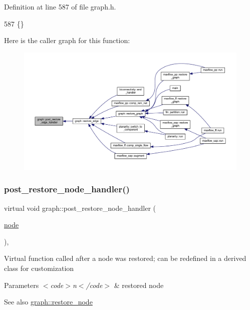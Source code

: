 Definition at line 587 of file graph.\+h.


\begin{DoxyCode}
587 \{\}
\end{DoxyCode}
Here is the caller graph for this function\+:
\nopagebreak
\begin{figure}[H]
\begin{center}
\leavevmode
\includegraphics[width=350pt]{classgraph_adfc71011ae82f047c550eba6d9e7bb3a_icgraph}
\end{center}
\end{figure}
\mbox{\label{classgraph_a2d555506de6aa30bb981f0b60375762d}} 
\subsubsection{\texorpdfstring{post\+\_\+restore\+\_\+node\+\_\+handler()}{post\_restore\_node\_handler()}}
{\footnotesize\ttfamily virtual void graph\+::post\+\_\+restore\+\_\+node\+\_\+handler (\begin{DoxyParamCaption}\item[{\mbox{\hyperlink{classnode}{node}}}]{ }\end{DoxyParamCaption})\hspace{0.3cm}{\ttfamily [inline]}, {\ttfamily [virtual]}}

Virtual function called after a node was restored; can be redefined in a derived class for customization


\begin{DoxyParams}{Parameters}
{\em $<$code$>$n$<$/code$>$} & restored node \\
\hline
\end{DoxyParams}
\begin{DoxySeeAlso}{See also}
\mbox{\hyperlink{classgraph_ab57aab79e649cc275052b7decbdd03ec}{graph\+::restore\+\_\+node}} 
\end{DoxySeeAlso}


